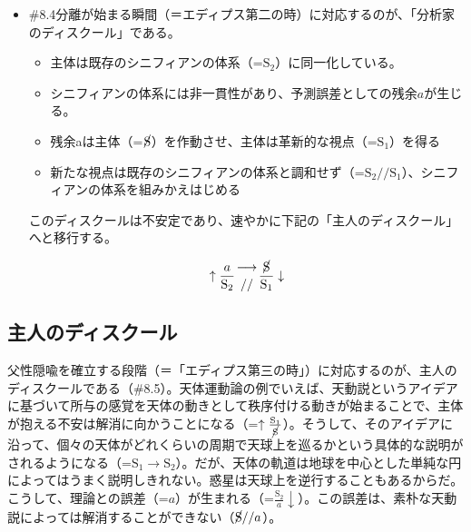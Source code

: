 \begin{note}{}
  \begin{itemize}
    \tightlist
    \item{\#8.4}分離が始まる瞬間（＝エディプス第二の時）に対応するのが、「分析家のディスクール」である。
      \begin{itemize}
        \tightlist
        \item 主体は既存のシニフィアンの体系（=$\textrm{S}_2$）に同一化している。
        \item シニフィアンの体系には非一貫性があり、予測誤差としての残余$a$が生じる。
        \item 残余aは主体（=$\cancel{\textrm{S}}$）を作動させ、主体は革新的な視点（=$\textrm{S}_1$）を得る
        \item 新たな視点は既存のシニフィアンの体系と調和せず（=$\textrm{S}_2//\textrm{S}_1$）、シニフィアンの体系を組みかえはじめる
      \end{itemize}このディスクールは不安定であり、速やかに下記の「主人のディスクール」へと移行する。

$$
\uparrow\frac{a}{\mathrm{S_2}}\genfrac{}{}{0pt}{}{\longrightarrow}{//}\frac{\cancel{\textrm{S}}}{\mathrm{S_1}}\downarrow
$$
  \end{itemize}
\end{note}

\subsection{主人のディスクール}\label{ux4e3bux4ebaux306eux30c7ux30a3ux30b9ux30afux30fcux30eb}

父性隠喩を確立する段階（＝「エディプス第三の時」）に対応するのが、主人のディスクールである（\#8.5）。天体運動論の例でいえば、天動説というアイデアに基づいて所与の感覚を天体の動きとして秩序付ける動きが始まることで、主体が抱える不安は解消に向かうことになる（=\(\uparrow\frac{\textrm{S}_1}{\cancel{\textrm{S}}}\)）。そうして、そのアイデアに沿って、個々の天体がどれくらいの周期で天球上を巡るかという具体的な説明がされるようになる（=\(\textrm{S}_1\rightarrow\textrm{S}_2\)）。だが、天体の軌道は地球を中心とした単純な円によってはうまく説明しきれない。惑星は天球上を逆行することもあるからだ。こうして、理論との誤差（=\(a\)）が生まれる（=\(\frac{\textrm{S}_2}{a}\downarrow\)）。この誤差は、素朴な天動説によっては解消することができない（\(\cancel{\textrm{S}}//a\)）。

